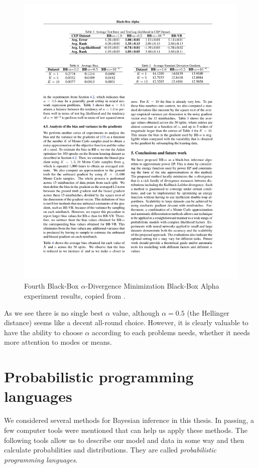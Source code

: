 \documentclass[12pt,vu]{adammath}
\theoremstyle{plain}
\theoremstyle{definition}
\theoremstyle{remark}
\begin{document}
\begin{figure}[p]\label{f:bbalpha4}
  \centering\includegraphics{figures/from-bb-alpha-4.pdf}
  \caption{Fourth Black-Box $\alpha$-Divergence Minimization Black-Box Alpha experiment results, copied from \cite{bbalpha}.}
\end{figure}

As we see there is no single best $\alpha$ value, although $\alpha = 0.5$ (the Hellinger distance) seems like a decent all-round choice.
However, it is clearly valuable to have the ability to choose $\alpha$ according to each problems needs, whether it needs more attention to modes or means.

\chapter{Probabilistic programming languages}\label{ppl}
We considered several methods for Bayesian inference in this thesis.
In passing, a few computer tools were mentioned that can help us apply these methods.
The following tools allow us to describe our model and data in some way and then calculate probabilities and distributions.
They are called \emph{probabilistic programming languages}.
\end{document}
